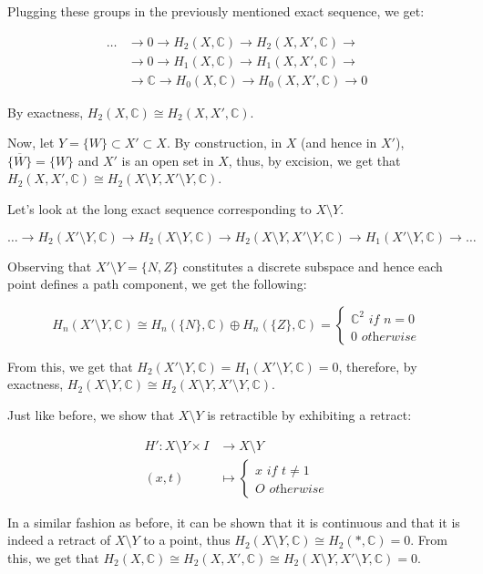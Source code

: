 \documentclass{article}
\newcommand{\numberset}{\mathbb}
\newcommand{\C}{\numberset{C}}
\begin{document}
Plugging these groups in the previously mentioned exact sequence, we get:

\begin{align*}
		\ldots & \rightarrow 0\rightarrow H_2(X,\C)\rightarrow H_2(X,X',\C)\rightarrow \\
		& \rightarrow 0\rightarrow H_1(X,\C)\rightarrow H_1(X,X',\C)\rightarrow \\
		& \rightarrow \C\rightarrow H_0(X,\C)\rightarrow H_0(X,X',\C)\rightarrow 0
\end{align*}

By exactness, $H_2(X,\C)\cong H_2(X,X',\C)$.

Now, let $Y=\{W\}\subset X'\subset X$. By construction, in $X$ (and hence in $X'$), $\overline{\{W\}}=\{W\}$ and $X'$ is an open set in $X$, thus, by excision, we get that $H_2(X,X',\C)\cong H_2(X\setminus Y,X'\setminus Y,\C)$.

Let's look at the long exact sequence corresponding to $X\setminus Y$.

$$\ldots\rightarrow H_2(X'\setminus Y,\C)\rightarrow H_2(X\setminus Y,\C)\rightarrow H_2(X\setminus Y,X'\setminus Y,\C)\rightarrow H_1(X'\setminus Y,\C)\rightarrow\ldots$$

Observing that $X'\setminus Y=\{N,Z\}$ constitutes a discrete subspace and hence each point defines a path component, we get the following:

$$
H_n(X'\setminus Y,\C)\cong H_n(\{N\},\C)\oplus H_n(\{Z\},\C)=\begin{cases}
		\C^2\textit{ if } n=0 \\
		0\textit{ otherwise}
\end{cases}
$$

From this, we get that $H_2(X'\setminus Y,\C)=H_1(X'\setminus Y,\C)=0$, therefore, by exactness, $H_2(X\setminus Y,\C)\cong H_2(X\setminus Y,X'\setminus Y,\C)$.

Just like before, we show that $X\setminus Y$ is retractible by exhibiting a retract:

\begin{align*}
		H': X\setminus Y\times I & \rightarrow X\setminus Y \\
				(x,t) & \mapsto \begin{cases}
										x \textit{ if } t\neq 1 \\
										O \textit{ otherwise}
								\end{cases}
\end{align*}

In a similar fashion as before, it can be shown that it is continuous and that it is indeed a retract of $X\setminus Y$ to a point, thus $H_2(X\setminus Y,\C)\cong H_2(*,\C)=0$. From this, we get that $H_2(X,\C)\cong H_2(X,X',\C)\cong H_2(X\setminus Y,X'\setminus Y,\C)=0$.
\end{document}
